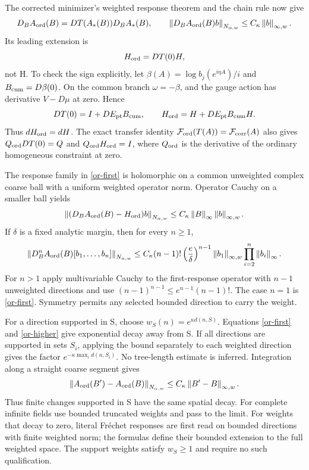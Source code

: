 \documentclass[11pt]{article}
\theoremstyle{remark}
\newcommand{\norm}[1]{\left\|#1\right\|}
\begin{document}
The corrected minimizer's weighted response theorem and the chain
rule now give
\begin{equation}\label{or-first}
 D_BA_{\rm ord}(B)=DT(A_*(B))D_BA_*(B),\qquad
 \norm{D_BA_{\rm ord}(B)b}_{N_{\alpha,w}}
                 \le C_\kappa\norm{b}_{\infty,w}.
\end{equation}
Its leading extension is
\begin{equation}\label{or-leading}
 H_{\rm ord}=DT(0)H,
\end{equation}
not H. To check the sign explicitly, let
$\beta(A)=\log b_j(e^{i\eta A})/i$ and
$B_{\rm cum}=D\beta(0)$. On the common branch $\omega=-\beta$,
and the gauge action has derivative $V-D\mu$ at zero. Hence
\begin{equation}\label{or-leading-explicit}
 DT(0)=I+DE_{\rm pt}B_{\rm cum},\qquad
 H_{\rm ord}=H+DE_{\rm pt}B_{\rm cum}H.
\end{equation}
Thus $dH_{\rm ord}=dH$.
The exact transfer identity
$\mathcal F_{\rm ord}(T(A))=\mathcal F_{\rm corr}(A)$
also gives $Q_{\rm ord}DT(0)=Q$ and
$Q_{\rm ord}H_{\rm ord}=I$, where $Q_{\rm ord}$ is the
derivative of the ordinary homogeneous constraint at zero.

The response family in \eqref{or-first} is holomorphic on a
common unweighted complex coarse ball with a uniform weighted
operator norm. Operator Cauchy on a smaller ball yields
\begin{equation}\label{or-linear-correction}
 \norm{(D_BA_{\rm ord}(B)-H_{\rm ord})b}_{N_{\alpha,w}}
       \le C_\kappa\norm{B}_\infty\norm{b}_{\infty,w}.
\end{equation}
If $\delta$ is a fixed analytic margin, then for every $n\ge1$,
\begin{equation}\label{or-higher}
 \norm{D_B^nA_{\rm ord}(B)[b_1,\ldots,b_n]}_{N_{\alpha,w}}
 \le C_\kappa(n-1)!\left(\frac e\delta\right)^{n-1}
       \norm{b_1}_{\infty,w}\prod_{i=2}^n\norm{b_i}_\infty.
\end{equation}
For $n>1$ apply multivariable Cauchy to the first-response
operator with $n-1$ unweighted directions and use
$(n-1)^{n-1}\le e^{n-1}(n-1)!$. The case $n=1$ is
\eqref{or-first}. Symmetry permits any selected bounded direction
to carry the weight.

For a direction supported in S, choose
$w_S(n)=e^{\kappa d(n,S)}$. Equations \eqref{or-first} and
\eqref{or-higher} give exponential decay away from S. If all
directions are supported in sets $S_i$, applying the bound
separately to each weighted direction gives the factor
$e^{-\kappa\max_i d(n,S_i)}$. No tree-length estimate is inferred.
Integration along a straight coarse segment gives
\begin{equation}\label{or-finite-change}
 \norm{A_{\rm ord}(B')-A_{\rm ord}(B)}_{N_{\alpha,w}}
       \le C_\kappa\norm{B'-B}_{\infty,w}.
\end{equation}
Thus finite changes supported in S have the same spatial decay.
For complete infinite fields use bounded truncated weights and
pass to the limit. For weights that decay to zero, literal
Fr\'echet responses are first read on bounded directions with
finite weighted norm; the formulas define their bounded extension
to the full weighted space. The support weights satisfy $w_S\ge1$
and require no such qualification.
\end{document}

